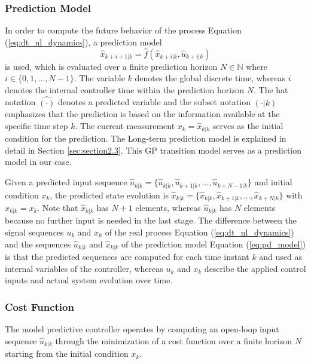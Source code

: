 \subsubsection{Prediction Model} \label{sec:prediction model}
In order to compute the future behavior of the process Equation (\ref{eq:dt_nl_dynamics}), a prediction model
\begin{equation}\label{eq:pd_model}
 \hat{x}_{k+i+1|k} = \hat{f}(\hat{x}_{k+i|k}, \hat{u}_{k+i|k})
\end{equation}
is used, which is evaluated over a finite prediction horizon $N \in \mathbb{N}$ where $i \in \{0,1,...,N-1\}$. The variable $k$ denotes the global discrete time, whereas $i$ denotes the internal controller time within the prediction horizon $N$. The hat notation $\hat{(\cdot)}$ denotes a predicted variable and the subset notation $(\cdot|k)$ emphasizes that the prediction is based on the information available at the specific time step $k$. The current measurement $x_k = \hat{x}_{k|k}$ serves as the initial condition for the prediction. The Long-term prediction model is explained in detail in Section \ref{sec:section2.3}. This GP transition model serves as a prediction model in our case.

Given a predicted input sequence $\hat{u}_{k|k} = \{\hat{u}_{k|k}, \hat{u}_{k+1|k}, ..., \hat{u}_{k+N-1|k}\}$ and initial condition $x_k$, the predicted state evolution is $\hat{x}_{k|k} = \{\hat{x}_{k|k}, \hat{x}_{k+1|k}, ..., \hat{x}_{k+N|k}\}$ with $\hat{x}_{k|k} = x_k$. Note that $\hat{x}_{k|k}$ has $N + 1$ elements, whereas $\hat{u}_{k|k}$ has $N$ elements because no further input is needed in the last stage. The difference between the signal sequences $u_k$ and $x_k$ of the real process Equation (\ref{eq:dt_nl_dynamics}) and the sequences $\hat{u}_{k|k}$ and $\hat{x}_{k|k}$ of the prediction model Equation (\ref{eq:pd_model}) is that the predicted sequences are computed for each time instant $k$ and used as internal variables of the controller, whereas $u_k$ and $x_k$ describe the applied control inputs and actual system evolution over time.

\subsubsection{Cost Function} \label{sec:costfunc}
The model predictive controller operates by computing an open-loop input sequence $\hat{u}_{k|k}$ through the minimization of a cost function over a finite horizon $N$ starting from the initial condition $x_k$. 

